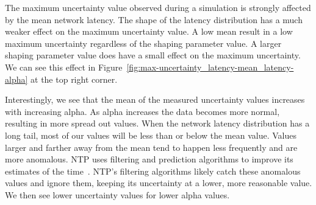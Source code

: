 



The maximum uncertainty value observed during a simulation is strongly
affected by the mean network latency. The shape of the latency
distribution has a much weaker effect on the maximum uncertainty
value.  A low mean result in a low maximum uncertainty regardless of
the shaping parameter value. A larger shaping parameter value does
have a small effect on the maximum uncertainty. We can see this effect
in Figure~\ref{fig:max-uncertainty_latency-mean_latency-alpha} at the
top right corner.

Interestingly, we see that the mean of the measured uncertainty values
increases with increasing alpha. As alpha increases the data becomes
more normal, resulting in more spread out values.  When the network
latency distribution has a long tail, most of our values will be less
than or below the mean value. Values larger and farther away from the
mean tend to happen less frequently and are more anomalous. NTP uses
filtering and prediction algorithms to improve its estimates of the
time~\citep{Burbank2010}. NTP's filtering algorithms likely catch
these anomalous values and ignore them, keeping its uncertainty at a
lower, more reasonable value. We then see lower uncertainty values for
lower alpha values.

